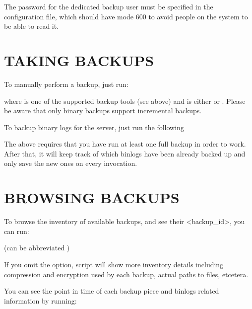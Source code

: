 \documentclass[letterpaper,10pt,english]{sphinxmanual}
\begin{document}
\sphinxAtStartPar
{}

\sphinxAtStartPar
The password for the dedicated backup user must be specified in the configuration
file, which should have mode 600 to avoid people on the system to be able to read it.


\section{TAKING BACKUPS}
\label{\detokenize{mariadb-backup-manager:taking-backups}}
\sphinxAtStartPar
To manually perform a backup, just run:

\sphinxAtStartPar
{}

\sphinxAtStartPar
where  is one of the supported backup tools (see above) and  is
either  or . Please be aware that only binary backups support incremental
backups.

\sphinxAtStartPar
To backup binary logs for the server, just run the following

\sphinxAtStartPar
{}

\sphinxAtStartPar
The above requires that you have run at least one full backup in order to work. After
that, it will keep track of which binlogs have been already backed up and only
save the new ones on every invocation.


\section{BROWSING BACKUPS}
\label{\detokenize{mariadb-backup-manager:browsing-backups}}
\sphinxAtStartPar
To browse the inventory of available backups, and see their \textless{}backup\_id\textgreater{},  you can run:

\sphinxAtStartPar
{} (can be abbreviated )

\sphinxAtStartPar
If you omit the  option, script will show more inventory details including
compression and encryption used by each backup, actual paths to files, etcetera.

\sphinxAtStartPar
You can see the point in time of each backup piece and binlogs related information
by running:
\end{document}
